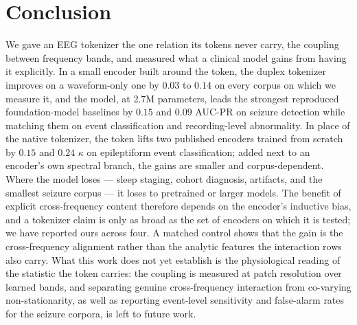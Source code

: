 \section{Conclusion}
\label{sec:conclusion}

We gave an EEG tokenizer the one relation its tokens never carry, the
coupling between frequency bands, and measured what a clinical model
gains from having it explicitly. In a small encoder built around the
token, the duplex tokenizer improves on a waveform-only one by $0.03$ to
$0.14$ on every corpus on which we measure it, and the model, at 2.7M parameters,
leads the strongest reproduced foundation-model baselines by $0.15$ and
$0.09$ AUC-PR on seizure detection while matching them on event
classification and recording-level abnormality. In place of the native
tokenizer, the token lifts two published encoders trained from scratch
by $0.15$ and $0.24$ $\kappa$ on epileptiform event classification; added
next to an encoder's own spectral branch, the gains are smaller and
corpus-dependent. Where the model loses --- sleep staging, cohort
diagnosis, artifacts, and the smallest seizure corpus --- it loses to
pretrained or larger models. The benefit of explicit cross-frequency
content therefore depends on the encoder's inductive bias, and a
tokenizer claim is only as broad as the set of encoders on which it is
tested; we have reported ours across four. A matched control shows that
the gain is the cross-frequency alignment rather than the analytic
features the interaction rows also carry. What this work does not yet
establish is the physiological reading of the statistic the token carries: the coupling is measured at patch resolution over learned bands,
and separating genuine cross-frequency interaction from co-varying
non-stationarity, as well as reporting event-level sensitivity and
false-alarm rates for the seizure corpora, is left to future work.
